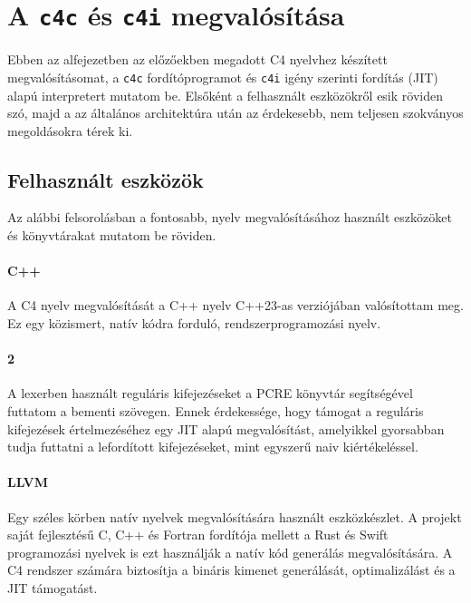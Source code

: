\section{A {\tt c4c} és {\tt c4i} megvalósítása}\label{sec:c4:impl}

Ebben az alfejezetben az előzőekben megadott C4 nyelvhez készített megvalósításomat, a {\tt c4c} fordítóprogramot és {\tt c4i} igény szerinti fordítás (\gls{JIT}) alapú interpretert mutatom be.
Elsőként a felhasznált eszközökről esik röviden szó, majd a az általános architektúra után az érdekesebb, nem teljesen szokványos megoldásokra térek ki.

\subsection{Felhasznált eszközök}\label{subsec:c4:impl:tools}

Az alábbi felsorolásban a fontosabb, nyelv megvalósításához használt eszközöket és könyvtárakat mutatom be röviden.

\paragraph{C++} A C4 nyelv megvalósítását a C++ nyelv C++23-as verziójában valósítottam meg.
Ez egy közismert, natív kódra forduló, rendszerprogramozási nyelv.

\paragraph{2 \cite{hazelPCREPerlCompatible2015}} A lexerben használt reguláris kifejezéseket a \gls{PCRE} könyvtár segítségével futtatom a bementi szövegen.
Ennek érdekessége, hogy támogat a reguláris kifejezések értelmezéséhez egy \gls{JIT} alapú megvalósítást, amelyikkel gyorsabban tudja futtatni a lefordított kifejezéseket, mint egyszerű naiv kiértékeléssel.

\paragraph{LLVM \cite{llvmprojectLLVMCompilerInfrastructure2025}} Egy széles körben natív nyelvek megvalósítására használt eszközkészlet.
A projekt saját fejlesztésű C, C++ és Fortran fordítója mellett a Rust és Swift programozási nyelvek is ezt használják a natív kód generálás megvalósítására.
A C4 rendszer számára biztosítja a bináris kimenet generálását, optimalizálást és a \gls{JIT} támogatást.

